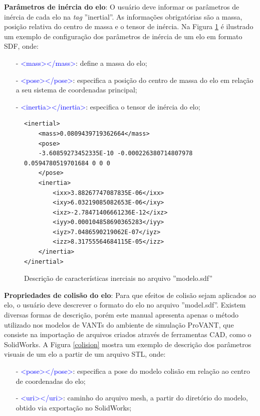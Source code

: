 \noindent \textbf{Parâmetros de inércia do elo}: O usuário deve informar os parâmetros de inércia de cada elo na \textit{tag} ''inertial''. As informações obrigatórias são a massa, posição relativa do centro de massa e o tensor de inércia. Na Figura \ref{inertial} é ilustrado um exemplo de configuração dos parâmetros de inércia de um elo em formato SDF, onde:
\small
\begin{itemize}
\setlength{\itemsep}{1pt}
\setlength{\parskip}{0pt}
\setlength{\parsep}{0pt}
\item[-] \textcolor{blue}{<mass></mass>}: define a massa do elo;
\item[-] \textcolor{blue}{<pose></pose>}: especifica a posição do centro de massa do elo em relação a seu sistema de coordenadas principal;
\item[-] \textcolor{blue}{<inertia></inertia>}: especifica o tensor de inércia do elo;
\end{itemize}\normalsize

\begin{figure}[H]
\begin{verbatim}
<inertial>
	<mass>0.0809439719362664</mass>
	<pose>
	-3.60859273452335E-10 -0.000226380714807978 0.0594780519701684 0 0 0
	</pose>
	<inertia>
		<ixx>3.88267747087835E-06</ixx>
		<ixy>6.03219085082653E-06</ixy>
		<ixz>-2.78471406661236E-12</ixz>
		<iyy>0.000104858690365283</iyy>
		<iyz>7.0486590219062E-07</iyz>
		<izz>8.31755564684115E-05</izz>		
	</inertia>
</inertial>
\end{verbatim}
\vspace{-0.8cm}
\caption{Descrição de características inerciais no arquivo ''modelo.sdf''}
\label{inertial}
\end{figure}


\noindent \textbf{Propriedades de colisão do elo}: Para que efeitos de colisão sejam aplicados ao elo, o usuário deve descrever o formato do elo no arquivo ''model.sdf''. Existem diversas formas de descrição, porém este manual apresenta apenas o método utilizado nos modelos de VANTs do ambiente de simulação ProVANT, que consiste na importação de arquivos criados através de ferramentas CAD, como o SolidWorks. A Figura \ref{colision} mostra um exemplo de descrição dos parâmetros visuais de um elo a partir de um arquivo STL, onde:
\small
\begin{itemize}
\setlength{\itemsep}{1pt}
\setlength{\parskip}{0pt}
\setlength{\parsep}{0pt}
\item[-] \textcolor{blue}{<pose></pose>}: especifica a pose do modelo colisão em relação ao centro de coordenadas do elo;
\item[-] \textcolor{blue}{<uri></uri>}: caminho do arquivo mesh, a partir do diretório do modelo, obtido via exportação no SolidWorks; 
\end{itemize} \normalsize

